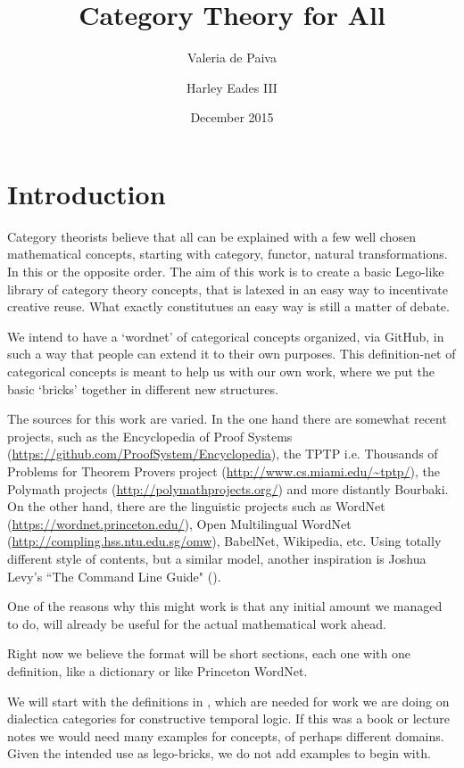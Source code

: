 \documentclass{article}
\title{Category Theory for All}
\author{Valeria de Paiva \and Harley Eades III}
\date{December 2015}
\begin{document}
\maketitle

\section*{Introduction}
Category theorists believe that all can be explained with a few well chosen mathematical concepts, starting with category, 
functor, natural transformations. In this or the opposite order. The aim of this work is to create a basic 
Lego-like library  of category theory concepts, that is latexed in an easy way to incentivate creative reuse. What exactly constitutues an easy way is still a matter of debate.

We intend to have a `wordnet' of categorical concepts organized, via GitHub, in such a way that people can 
extend it to their own purposes. This definition-net of categorical concepts is meant to help us with our 
own work, where we put the basic `bricks' together in different new structures.

The  sources for this work are varied. In the one hand there are somewhat recent projects, such as the  
Encyclopedia of Proof Systems (\url{https://github.com/ProofSystem/Encyclopedia}), 
the TPTP i.e. Thousands of Problems for Theorem Provers project (\url{http://www.cs.miami.edu/~tptp/}),   
the Polymath projects (\url{http://polymathprojects.org/}) and  more distantly Bourbaki. 
On the other hand, there are the linguistic projects such as WordNet (\url{https://wordnet.princeton.edu/}), 
Open Multilingual WordNet (\url{http://compling.hss.ntu.edu.sg/omw}), BabelNet, Wikipedia, etc.  
Using totally  different style of contents, but a similar model, another inspiration is 
Joshua Levy's ``The Command Line Guide" (\url{}).

One of the reasons why this might work is that any initial amount we managed to do, 
will already be useful for the actual mathematical work ahead. 

Right now we believe the format will be short sections, each one  with one definition, like a dictionary or like Princeton WordNet. 

We will start with the definitions in \citep{depaiva1996}, which are needed for work we are doing on 
dialectica categories for constructive temporal logic. If this was a book or lecture notes we would need many examples for concepts,  of perhaps different domains. Given the intended use as lego-bricks, we do not add examples to begin with.
\end{document}
